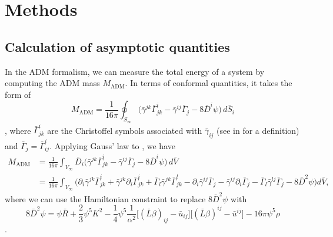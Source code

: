 \documentclass{../document}
\begin{document}
  \section{Methods}

    \subsection{Calculation of asymptotic quantities}

      In the ADM formalism, we can measure the total energy of a system by computing the ADM mass $M_\text{ADM}$. In terms of conformal quantities, it takes the form of
      \begin{equation} \label{eq:Madm-surf}
        M_\text{ADM}
        = \frac{1}{16\pi} \oint_{S_\infty}  \Big(
          \bar\gamma^{jk} \bar\Gamma^i_{jk}
          - \bar\gamma^{ij} \bar\Gamma_{j}
          - 8 \bar D^i \psi
          \Big) \, d\bar{S}_i
      \end{equation}
      \cite[]{BaumgarteShapiro}, where $\bar\Gamma^i_{jk}$ are the Christoffel symbols associated with $\bar\gamma_{ij}$ (see  in \cite{BaumgarteShapiro} for a definition) and $\bar\Gamma_{j} = \bar\Gamma^{i}_{ij}$. Applying Gauss' law to \eq{\eqref{eq:Madm-surf}}, we have
      \begin{align}
        M_\text{ADM}
        &= \frac{1}{16\pi}
            \int_{V_\infty} \bar D_i  \Big(
              \bar\gamma^{jk} \bar\Gamma^i_{jk}
              - \bar\gamma^{ij} \bar\Gamma_{j}
              - 8 \bar D^i \psi
            \Big) \, d\bar{V} \\
        &= \frac{1}{16\pi}
            \int_{V_\infty} \Big(
              \partial_i \bar\gamma^{jk} \bar\Gamma^i_{jk}
              + \bar\gamma^{jk} \partial_i \bar\Gamma^i_{jk}
              + \bar\Gamma_l \bar\gamma^{jk} \bar\Gamma^l_{jk}
              - \partial_i \bar\gamma^{ij} \bar\Gamma_j
              - \bar\gamma^{ij} \partial_i \bar\Gamma_j
              - \bar\Gamma_l \bar\gamma^{lj} \bar\Gamma_j
              - 8 \bar D^2 \psi
            \Big) d\bar{V},
      \end{align}
      where we can use the Hamiltonian constraint to replace $8 \bar D^2 \psi$ with
      \begin{equation}
        8 \bar D^2 \psi = \psi \bar R + \frac{2}{3} \psi^5 K^2
                          - \frac{1}{4} \psi^5 \frac{1}{\alpha^2}
                              \Big[ (\bar L \beta)_{ij} - \bar u_{ij} \Big]
                              \Big[ (\bar L \beta)^{ij} - \bar u^{ij} \Big]
                          - 16\pi \psi^5 \rho
      \end{equation}
      \cite[]{BaumgarteShapiro}.
\end{document}
